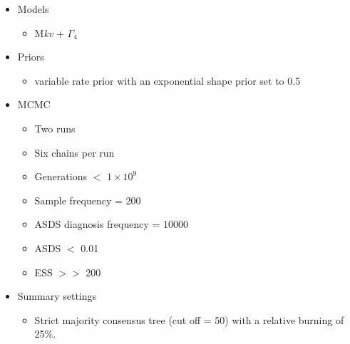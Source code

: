 \documentclass[12pt,letterpaper]{article}
\begin{document}
\begin{itemize}
  \item Models
  \begin{itemize}
    \item M\textit{kv} + $\Gamma_4$
  \end{itemize}

  \item Priors
  \begin{itemize}
    \item variable rate prior with an exponential shape prior set to 0.5
  \end{itemize}

  \item MCMC
  \begin{itemize}
    \item Two runs
    \item Six chains per run
    \item Generations $<$ $1\times10^9$
    \item Sample frequency = 200
    \item ASDS diagnosis frequency = 10000
    \item ASDS $<$ 0.01
    \item ESS $>>$ 200
  \end{itemize}

  \item Summary settings
  \begin{itemize}
    \item Strict majority consensus tree (cut off = 50) with a relative burning of 25\%.
  \end{itemize}

\end{itemize}




\end{document}
